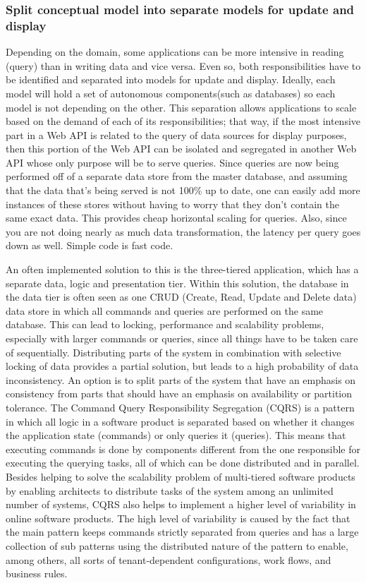 \documentclass[10pt,article]{IEEEtran}
\begin{document}
\subsubsection{Split conceptual model into separate models for update and display}
Depending on the domain, some applications can be more intensive in reading (query) than in writing data and vice versa.  Even so, both responsibilities have to be identified and separated into models for update and display. Ideally, each model will hold a set of autonomous components(such as databases) so each model is not depending on the other. This separation allows applications to scale based on the demand of each of its responsibilities; that way, if the most intensive part in a Web API is related to the query of data sources for display purposes, then this portion of the Web API can be isolated and segregated in another Web API whose only purpose will be to serve queries. Since queries are now being performed off of a separate data store from the master database, and assuming that the data that's being served is not 100\% up to date, one can easily add more instances of these stores without having to worry that they don’t contain the same exact data. This provides cheap horizontal scaling for queries. Also, since you are not doing nearly as much data transformation, the latency per query goes down as well. Simple code is fast code\cite{dahan:cqrs}.

An often implemented solution to this is the three-tiered application, which has a separate data, logic and presentation tier. Within this solution, the database in the data tier is often seen as one CRUD (Create, Read, Update and Delete data) data store in which all commands and queries are performed on the same database. This can lead to locking, performance and scalability problems, especially with larger commands or queries, since all things have to be taken care of sequentially. Distributing parts of the system in combination with selective locking of data provides a partial solution, but leads to a high probability of data inconsistency.
An option is to split parts of the system that have an emphasis on consistency from parts that should have an emphasis on availability or partition tolerance. The Command Query Responsibility Segregation (CQRS) is a pattern in which all logic in a software product is separated based on whether it changes the application state (commands) or only queries it (queries). This means that executing commands is done by components different from the one responsible for executing the querying tasks, all of which can be done distributed and in parallel.
Besides helping to solve the scalability problem of multi-tiered software products by enabling architects to distribute tasks of the system among an unlimited number of systems, CQRS also helps to implement a higher level of variability in online software products. The high level of variability is caused by the fact that the main pattern keeps commands strictly separated from queries and has a large collection of sub patterns using the distributed nature of the pattern to enable, among others, all sorts of tenant-dependent configurations, work flows, and business rules\cite{cqrs:kabbedijk}.
\end{document}
